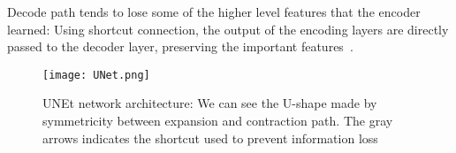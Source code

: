\documentclass{standalone}
\begin{document}
		Decode path tends to lose some of the higher level features that the encoder learned: Using shortcut connection, the output of the encoding layers are directly passed to the decoder layer, preserving the important features~\cite{PhDtheis}.
	
		
		\begin{figure}[h!]
			\centering
				\texttt{[image: UNet.png]}
					\caption{UNEt network architecture: We can see the U-shape made by symmetricity between expansion and contraction path. The gray arrows indicates the shortcut used to prevent information loss}\label{fig:UNet}
		\end{figure}
	
		
	
\end{document}
